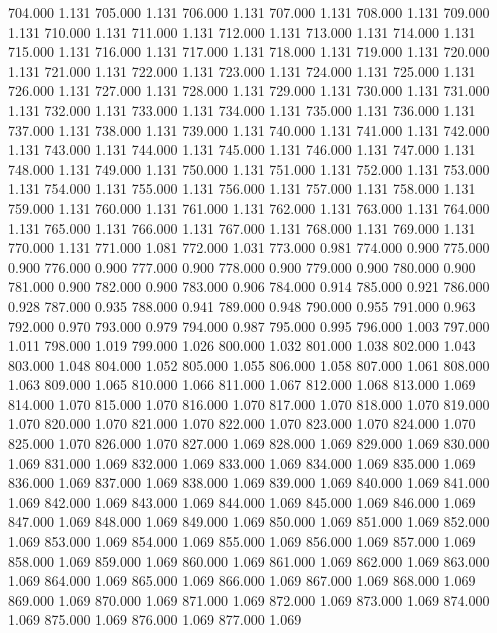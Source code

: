 704.000 1.131 
705.000 1.131 
706.000 1.131 
707.000 1.131 
708.000 1.131 
709.000 1.131 
710.000 1.131 
711.000 1.131 
712.000 1.131 
713.000 1.131 
714.000 1.131 
715.000 1.131 
716.000 1.131 
717.000 1.131 
718.000 1.131 
719.000 1.131 
720.000 1.131 
721.000 1.131 
722.000 1.131 
723.000 1.131 
724.000 1.131 
725.000 1.131 
726.000 1.131 
727.000 1.131 
728.000 1.131 
729.000 1.131 
730.000 1.131 
731.000 1.131 
732.000 1.131 
733.000 1.131 
734.000 1.131 
735.000 1.131 
736.000 1.131 
737.000 1.131 
738.000 1.131 
739.000 1.131 
740.000 1.131 
741.000 1.131 
742.000 1.131 
743.000 1.131 
744.000 1.131 
745.000 1.131 
746.000 1.131 
747.000 1.131 
748.000 1.131 
749.000 1.131 
750.000 1.131 
751.000 1.131 
752.000 1.131 
753.000 1.131 
754.000 1.131 
755.000 1.131 
756.000 1.131 
757.000 1.131 
758.000 1.131 
759.000 1.131 
760.000 1.131 
761.000 1.131 
762.000 1.131 
763.000 1.131 
764.000 1.131 
765.000 1.131 
766.000 1.131 
767.000 1.131 
768.000 1.131 
769.000 1.131 
770.000 1.131 
771.000 1.081 
772.000 1.031 
773.000 0.981 
774.000 0.900 
775.000 0.900 
776.000 0.900 
777.000 0.900 
778.000 0.900 
779.000 0.900 
780.000 0.900 
781.000 0.900 
782.000 0.900 
783.000 0.906 
784.000 0.914 
785.000 0.921 
786.000 0.928 
787.000 0.935 
788.000 0.941 
789.000 0.948 
790.000 0.955 
791.000 0.963 
792.000 0.970 
793.000 0.979 
794.000 0.987 
795.000 0.995 
796.000 1.003 
797.000 1.011 
798.000 1.019 
799.000 1.026 
800.000 1.032 
801.000 1.038 
802.000 1.043 
803.000 1.048 
804.000 1.052 
805.000 1.055 
806.000 1.058 
807.000 1.061 
808.000 1.063 
809.000 1.065 
810.000 1.066 
811.000 1.067 
812.000 1.068 
813.000 1.069 
814.000 1.070 
815.000 1.070 
816.000 1.070 
817.000 1.070 
818.000 1.070 
819.000 1.070 
820.000 1.070 
821.000 1.070 
822.000 1.070 
823.000 1.070 
824.000 1.070 
825.000 1.070 
826.000 1.070 
827.000 1.069 
828.000 1.069 
829.000 1.069 
830.000 1.069 
831.000 1.069 
832.000 1.069 
833.000 1.069 
834.000 1.069 
835.000 1.069 
836.000 1.069 
837.000 1.069 
838.000 1.069 
839.000 1.069 
840.000 1.069 
841.000 1.069 
842.000 1.069 
843.000 1.069 
844.000 1.069 
845.000 1.069 
846.000 1.069 
847.000 1.069 
848.000 1.069 
849.000 1.069 
850.000 1.069 
851.000 1.069 
852.000 1.069 
853.000 1.069 
854.000 1.069 
855.000 1.069 
856.000 1.069 
857.000 1.069 
858.000 1.069 
859.000 1.069 
860.000 1.069 
861.000 1.069 
862.000 1.069 
863.000 1.069 
864.000 1.069 
865.000 1.069 
866.000 1.069 
867.000 1.069 
868.000 1.069 
869.000 1.069 
870.000 1.069 
871.000 1.069 
872.000 1.069 
873.000 1.069 
874.000 1.069 
875.000 1.069 
876.000 1.069 
877.000 1.069 
